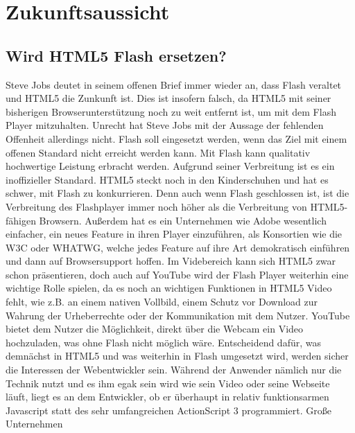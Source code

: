 \chapter{Zukunftsaussicht}
\section{Wird HTML5 Flash ersetzen?}

Steve Jobs deutet in seinem offenen Brief immer wieder an, dass
Flash veraltet und HTML5 die Zunkunft ist. Dies ist insofern falsch,
da HTML5 mit seiner bisherigen Browserunterstützung noch zu weit
entfernt ist, um mit dem Flash Player mitzuhalten. Unrecht hat 
Steve Jobs mit der Aussage der fehlenden Offenheit allerdings nicht.
Flash soll eingesetzt werden, wenn das Ziel mit einem offenen 
Standard nicht erreicht werden kann. Mit Flash kann qualitativ
hochwertige Leistung erbracht werden. Aufgrund seiner
Verbreitung ist es ein inoffizieller Standard.
\newline\newline
HTML5 steckt noch in den Kinderschuhen und hat es schwer, mit Flash
zu konkurrieren. Denn auch wenn Flash geschlossen ist, ist die Verbreitung
des Flashplayer immer noch höher als die Verbreitung von HTML5-fähigen
Browsern. Außerdem hat es ein Unternehmen wie Adobe wesentlich
einfacher, ein neues Feature in ihren Player einzuführen, als Konsortien wie
die W3C oder WHATWG, welche jedes Feature auf ihre Art demokratisch 
einführen und dann auf Browsersupport hoffen.
\newline\newline
Im Videbereich kann sich HTML5 zwar schon präsentieren, doch auch auf
YouTube wird der Flash Player weiterhin eine wichtige Rolle spielen, da es
noch an wichtigen Funktionen in HTML5 Video fehlt, wie z.B. an einem
nativen Vollbild, einem Schutz vor Download zur Wahrung der Urheberrechte
oder der Kommunikation mit dem Nutzer. YouTube bietet dem Nutzer die 
Möglichkeit, direkt über die Webcam ein Video hochzuladen, was ohne
Flash nicht möglich wäre.
\newline\newline
Entscheidend dafür, was demnächst in HTML5 und was weiterhin in Flash
umgesetzt wird, werden sicher die Interessen der Webentwickler sein. 
Während der Anwender nämlich nur die Technik nutzt und es ihm
egak sein wird wie sein Video oder seine Webseite läuft, liegt es an dem
Entwickler, ob er überhaupt in relativ funktionsarmen Javascript statt
des sehr umfangreichen ActionScript 3 programmiert. Große Unternehmen

